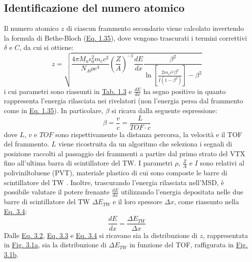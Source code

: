 \documentclass[12pt,a4paper,twoside]{report}
\begin{document}
	\subsection{Identificazione del numero atomico}
	Il numero atomico $z$ di ciascun frammento secondario viene calcolato invertendo la formula di Bethe-Bloch (\hyperref[eq:bethe_bloch]{Eq. 1.35}), dove vengono trascurati i termini correttivi $\delta$ e $C$, da cui si ottiene:
	\begin{equation}
		z=\sqrt{\frac{4\pi M_u\epsilon_0^2m_ec^2}{N_A\rho e^4}\left(\frac{Z}{A}\right)^{-1}\frac{dE}{dx}\frac{\beta^2}{\ln{\left[\frac{2m_ec^2\beta^2}{I\left(1-\beta^2\right)}\right]}-\beta^2}}
		\label{eq:atomic_number}
	\end{equation}
	i cui parametri sono riassunti in \hyperref[tab:bethe_bloch]{Tab. 1.3} e $\frac{dE}{dx}$ ha segno positivo in quanto rappresenta l'energia rilasciata nei rivelatori (non l'energia persa dal frammento come in \hyperref[eq:bethe_bloch]{Eq. 1.35}). In particolare, $\beta$ si ricava dalla seguente espressione:
	\begin{equation}
		\beta=\frac{v}{c}=\frac{L}{TOF\cdot c}
		\label{eq:beta_beam}
	\end{equation}
	dove $L$, $v$ e $TOF$ sono rispettivamente la distanza percorsa, la velocità e il TOF del frammento. $L$ viene ricostruita da un algoritmo che seleziona i segnali di posizione raccolti al passaggio dei frammenti a partire dal primo strato del VTX fino all'ultima barra di scintillatore del TW. I parametri $\rho$, $\frac{Z}{A}$ e $I$ sono relativi al poliviniltoluene (PVT), materiale plastico di cui sono composte le barre di scintillatore del TW \cite{pvt}. Inoltre, trascurando l'energia rilasciata nell'MSD, è possibile valutare il potere frenante $\frac{dE}{dx}$ utilizzando l'energia depositata nelle due barre di scintillatore del TW $\Delta E_{TW}$ e il loro spessore $\Delta x$, come riassunto nella \hyperref[eq:stopping_power]{Eq. 3.4}:
	\begin{equation}
		\frac{dE}{dx}=\frac{\Delta E_{TW}}{\Delta x}
		\label{eq:stopping_power}
	\end{equation}
	Dalle \hyperref[eq:atomic_number]{Eq. 3.2}, \hyperref[eq:beta_beam]{Eq. 3.3} e \hyperref[eq:stopping_power]{Eq. 3.4} si ricavano sia la distribuzione di $z$, rappresentata in \hyperref[fig:atomic_numbersa]{Fig. 3.1a}, sia la distribuzione di $\Delta E_{TW}$ in funzione del TOF, raffigurata in \hyperref[fig:atomic_numbersb]{Fig. 3.1b}.
\end{document}
